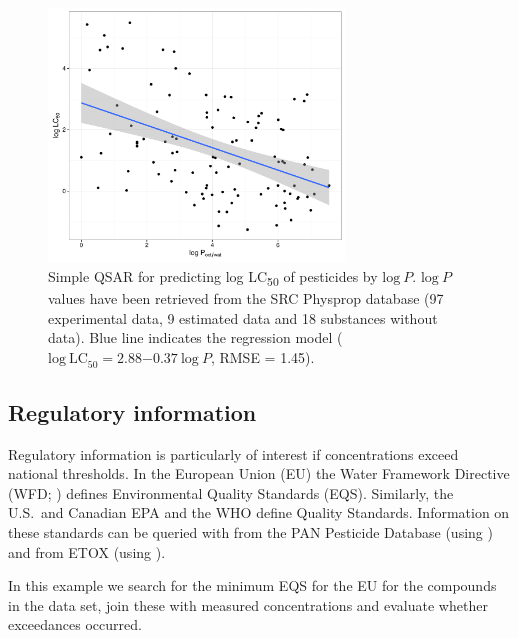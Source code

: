 \documentclass[article]{jss}
\begin{document}
\begin{figure}[t!]
  \centering
  \includegraphics[width=0.7\textwidth]{plot_qsar-1} 
  \caption{Simple QSAR for predicting log LC\textsubscript{50} of
    pesticides by $\mathrm{log}~P$.  $\mathrm{log}~P$ values have been
    retrieved from the SRC Physprop database (97 experimental data, 9
    estimated data and 18 substances without data).  Blue line
    indicates the regression model
    ($\mathrm{log~LC}_{50} = 2.88\ensuremath{-0.37}~\mathrm{log}~P$,
    RMSE = 1.45).}
\label{fig:fig3}
\end{figure}


\subsection[Regulatory information]{Regulatory information}
Regulatory information is particularly of interest if concentrations
exceed national thresholds.  In the European Union (EU) the Water
Framework Directive (WFD; \citealt{wfd2000directive}) defines
Environmental Quality Standards (EQS).  Similarly, the U.S.\ and
Canadian EPA and the WHO define Quality Standards.  Information on
these standards can be queried with  from the PAN
Pesticide Database (using ) and from ETOX (using
).

In this example we search for the minimum EQS for the EU for the
compounds in the  data set, join these with measured
concentrations and evaluate whether exceedances occurred.
\end{document}
